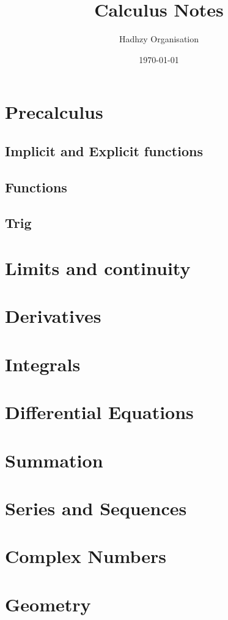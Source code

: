 \documentclass[a4paper,12pt]{book}
\author{Hadhzy Organisation}
\title{Calculus Notes}
\date{\today}
\begin{document}
\maketitle

\tableofcontents
\newpage 
\chapter{Precalculus}
\section{Implicit and Explicit functions}


\section{Functions}

\section{Trig}


\chapter{Limits and continuity}



\chapter{Derivatives}


\chapter{Integrals}


\chapter{Differential Equations}


\chapter{Summation}


\chapter{Series and Sequences}


\chapter{Complex Numbers}


\chapter{Geometry}

\end{document}
